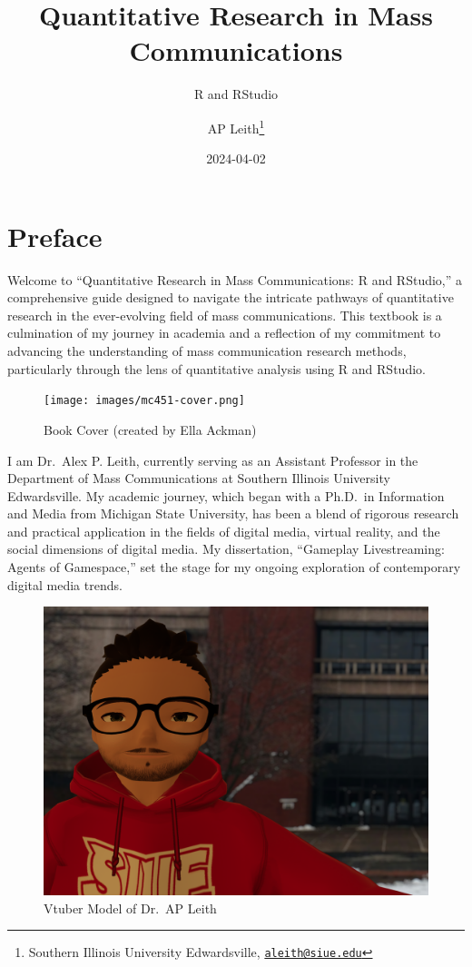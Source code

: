 \documentclass[
]{book}
\title{Quantitative Research in Mass Communications}
\subtitle{R and RStudio}
\author{AP Leith\footnote{Southern Illinois University Edwardsville, \href{mailto:aleith@siue.edu}{\nolinkurl{aleith@siue.edu}}}}
\date{2024-04-02}
\begin{document}
\maketitle

{
\setcounter{tocdepth}{1}
\tableofcontents
}
\hypertarget{preface}{%
\chapter*{Preface}\label{preface}}

Welcome to ``Quantitative Research in Mass Communications: R and RStudio,'' a comprehensive guide designed to navigate the intricate pathways of quantitative research in the ever-evolving field of mass communications. This textbook is a culmination of my journey in academia and a reflection of my commitment to advancing the understanding of mass communication research methods, particularly through the lens of quantitative analysis using R and RStudio.

\begin{figure}
\centering
\texttt{[image: images/mc451-cover.png]}
\caption{Book Cover (created by Ella Ackman)}
\end{figure}

I am Dr.~Alex P. Leith, currently serving as an Assistant Professor in the Department of Mass Communications at Southern Illinois University Edwardsville. My academic journey, which began with a Ph.D.~in Information and Media from Michigan State University, has been a blend of rigorous research and practical application in the fields of digital media, virtual reality, and the social dimensions of digital media. My dissertation, ``Gameplay Livestreaming: Agents of Gamespace,'' set the stage for my ongoing exploration of contemporary digital media trends.

\begin{figure}
\centering
\includegraphics[width=1\textwidth,height=\textheight]{images/fat_red_hoody_profile.png}
\caption{Vtuber Model of Dr.~AP Leith}
\end{figure}
\end{document}
